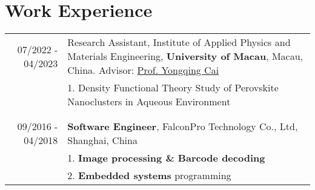 \documentclass[a4paper,10pt]{article} %
\begin{document}

\section{Work Experience}
\begin{tabular}{r|p{11cm}}
	07/2022 - 04/2023            & Research Assistant,  Institute of Applied Physics and Materials Engineering, \textbf{University of Macau}, Macau, China. Advisor: \href{https://scholar.google.com.sg/citations?user=902XZNwAAAAJ} {Prof. Yongqing Cai}  \\
	& 1. Density Functional Theory Study of  Perovskite Nanoclusters in Aqueous Environment \\
	\multicolumn{2}{c}{} \\	%
	\multicolumn{2}{c}{} \\	%
	09/2016 - 04/2018            & \textbf{Software Engineer}, FalconPro Technology Co., Ltd, Shanghai, China \\                          & 1. \textbf{Image processing \& Barcode decoding}\\
								& 2. \textbf{Embedded systems} programming\\
\end{tabular}
\end{document}
